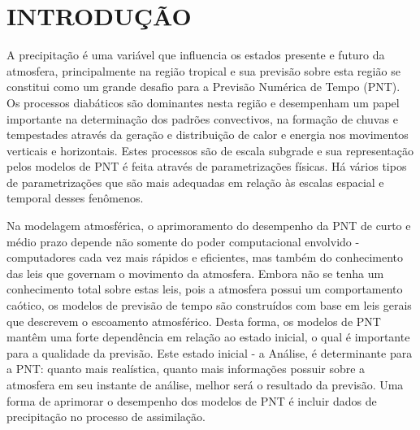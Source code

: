 \hypertarget{estilo:capitulo}{}
\chapter{INTRODUÇÃO} 

A precipitação é uma variável que influencia os estados presente e futuro da atmosfera,  principalmente na região tropical e sua previsão sobre esta região  se constitui como um grande desafio para a Previsão Numérica de Tempo (PNT). Os processos diabáticos são dominantes nesta região e desempenham um papel importante na determinação dos padrões convectivos, na formação de chuvas e tempestades através da geração e distribuição de calor e energia nos movimentos verticais e horizontais. Estes processos são de escala subgrade e sua representação pelos modelos de PNT é feita através de parametrizações  físicas. Há vários tipos de parametrizações que são mais adequadas em relação às escalas espacial e temporal desses fenômenos.

Na modelagem atmosférica, o aprimoramento do desempenho da PNT de curto e médio prazo depende não somente do poder computacional envolvido - computadores cada vez mais rápidos e eficientes, mas também do conhecimento das leis que governam o movimento da atmosfera. Embora não se tenha um conhecimento total sobre estas leis, pois a atmosfera possui um comportamento caótico, os modelos de previsão de tempo são construídos com base em leis gerais que descrevem o escoamento atmosférico. Desta forma, os modelos de PNT mantêm uma forte dependência em relação ao estado inicial, o qual é importante para a qualidade da previsão. Este estado inicial - a Análise, é determinante para a PNT: quanto mais realística, quanto mais informações possuir sobre a atmosfera em seu instante de análise, melhor será o resultado da previsão. Uma forma de aprimorar o desempenho dos modelos de PNT é incluir dados de precipitação no processo de assimilação.

